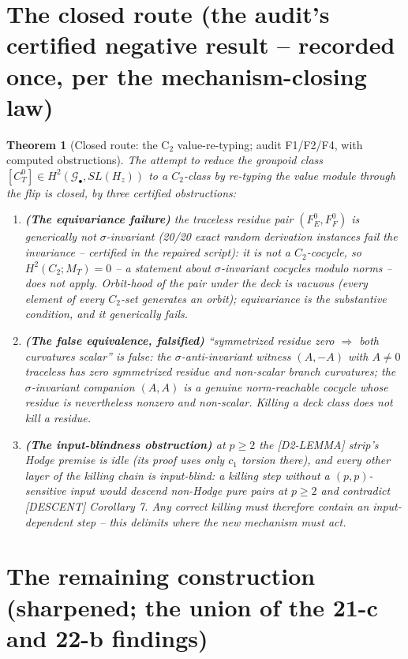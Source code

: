 \documentclass[11pt]{article}
\newtheorem{theorem}{Theorem}
\begin{document}
\section{The closed route (the audit's certified negative result -- recorded once, per the mechanism-closing law)}

\begin{theorem}[Closed route: the C$_2$ value-re-typing; audit F1/F2/F4, with computed obstructions]
The attempt to reduce the groupoid class $[C_T^0]\in H^2(\mathcal G_\bullet,SL(H_z))$ to a $C_2$-class by re-typing the value module through the flip is closed, by three certified obstructions:
\begin{enumerate}
\item \textbf{(The equivariance failure)} the traceless residue pair $(F^0_E,F^0_F)$ is \emph{generically not $\sigma$-invariant} (20/20 exact random derivation instances fail the invariance -- certified in the repaired script): it is not a $C_2$-cocycle, so $H^2(C_2;M_T)=0$ -- a statement about $\sigma$-invariant cocycles modulo norms -- does not apply. Orbit-hood of the pair under the deck is vacuous (every element of every $C_2$-set generates an orbit); equivariance is the substantive condition, and it generically fails.
\item \textbf{(The false equivalence, falsified)} ``symmetrized residue zero $\Rightarrow$ both curvatures scalar'' is false: the $\sigma$-anti-invariant witness $(A,-A)$ with $A\ne0$ traceless has zero symmetrized residue and non-scalar branch curvatures; the $\sigma$-invariant companion $(A,A)$ is a genuine norm-reachable cocycle whose residue is nevertheless nonzero and non-scalar. Killing a deck class does not kill a residue.
\item \textbf{(The input-blindness obstruction)} at $p\ge2$ the [D2-LEMMA] strip's Hodge premise is idle (its proof uses only $c_1$ torsion there), and every other layer of the killing chain is input-blind: a killing step without a $(p,p)$-sensitive input would descend non-Hodge pure pairs at $p\ge2$ and contradict [DESCENT] Corollary 7. Any correct killing must therefore contain an input-dependent step -- this delimits where the new mechanism must act.
\end{enumerate}
\end{theorem}

\section{The remaining construction (sharpened; the union of the 21-c and 22-b findings)}
\end{document}
